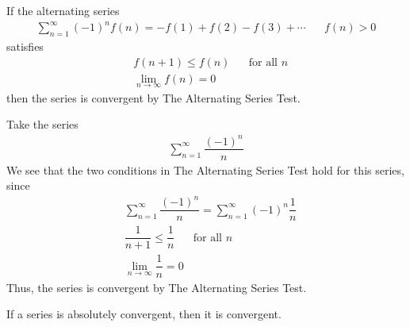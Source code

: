 \begin{theorem}
If the alternating series
\begin{align*}
    \sum_{n=1}^{\infty} (-1)^{n}f(n) = -f(1) + f(2) - f(3) + \cdots \hspace{20pt} f(n) > 0
\end{align*}
satisfies
\begin{align*}
    &f(n+1) \leq f(n) \hspace{20pt} \text{for all} \hspace{4pt} n\\[2ex]
    &\lim_{n \longrightarrow \infty} f(n) = 0
\end{align*}
then the series is convergent by The Alternating Series Test.
\end{theorem}

\begin{example}
Take the series
\begin{align*}
    \sum_{n=1}^{\infty} \dfrac{(-1)^{n}}{n}
\end{align*}
We see that the two conditions in The Alternating Series Test hold for this series, since
\begin{align*}
    &\sum_{n=1}^{\infty} \dfrac{(-1)^{n}}{n} = \sum_{n=1}^{\infty} (-1)^{n}\dfrac{1}{n}\\[2ex]
    &\dfrac{1}{n+1} \leq \dfrac{1}{n} \hspace{20pt} \text{for all} \hspace{4pt} n\\[2ex]
    &\lim_{n \longrightarrow \infty} \dfrac{1}{n} = 0
\end{align*}
Thus, the series is convergent by The Alternating Series Test.
\end{example}

\begin{theorem}
If a series is absolutely convergent, then it is convergent.
\end{theorem}

